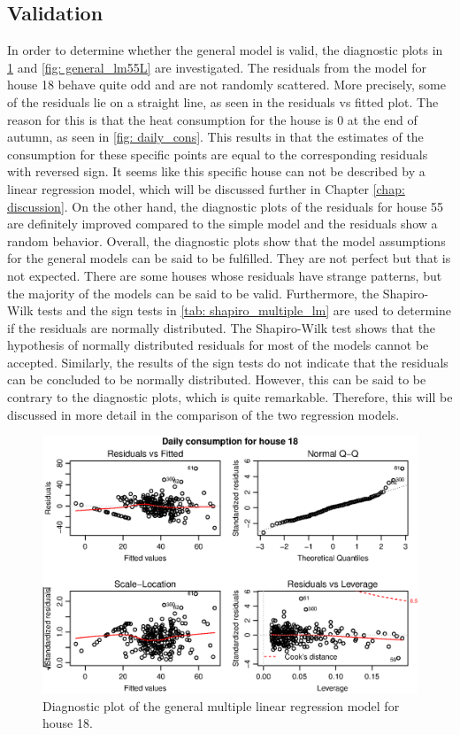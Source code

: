 \subsection{Validation}
In order to determine whether the general model is valid, the diagnostic plots in \cref{fig: general_lm18L} and \cref{fig: general_lm55L} are investigated. The residuals from the model for house 18 behave quite odd and are not randomly scattered. More precisely, some of the residuals lie on a straight line, as seen in the residuals vs fitted plot. The reason for this is that the heat consumption for the house is 0 at the end of autumn, as seen in \cref{fig: daily_cons}. This results in that the estimates of the consumption for these specific points are equal to the corresponding residuals with reversed sign. It seems like this specific house can not be described by a linear regression model, which will be discussed further in Chapter \ref{chap: discussion}. On the other hand, the diagnostic plots of the residuals for house 55 are definitely improved compared to the simple model and the residuals show a random behavior. Overall, the diagnostic plots show that the model assumptions for the general models can be said to be fulfilled. They are not perfect but that is not expected. There are some houses whose residuals have strange patterns, but the majority of the models can be said to be valid. Furthermore, the Shapiro-Wilk tests and the sign tests in \cref{tab: shapiro_multiple_lm} are used to determine if the residuals are normally distributed. The Shapiro-Wilk test shows that the hypothesis of normally distributed residuals for most of the models cannot be accepted. Similarly, the results of the sign tests do not indicate that the residuals can be concluded to be normally distributed. However, this can be said to be contrary to the diagnostic plots, which is quite remarkable. Therefore, this will be discussed in more detail in the comparison of the two regression models.
\begin{figure}
    \centering
    \includegraphics[width=1.\textwidth]{../../../figures/general_lm18L.eps}
    \caption{Diagnostic plot of the general multiple linear regression model for house 18. }
    \label{fig: general_lm18L}
\end{figure}
